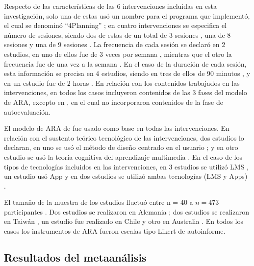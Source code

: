 \documentclass[spanish]{textolivre}
\begin{document}
Respecto de las características de las 6 intervenciones incluidas en esta investigación, solo una de estas usó un nombre para el programa que implementó, el cual se denominó “4Planning” \cite{lobos2021design}; en cuatro intervenciones se especifica el número de sesiones, siendo dos de estas de un total de 3 sesiones \cite{broadbent2020effects, van2020new}, una de 8 sesiones \cite{jansen2016fostering} y una de 9 sesiones \cite{lobos2021design}. La frecuencia de cada sesión se declaró en 2 estudios, en uno de ellos fue de 3 veces por semana \cite{bellhauser2016applying}, mientras que el otro la frecuencia fue de una vez a la semana \cite{van2020new}. En el caso de la duración de cada sesión, esta información se precisa en 4 estudios, siendo en tres de ellos de 90 minutos \cite{bellhauser2016applying, van2020new}, y en un estudio fue de 2 horas \cite{jansen2016fostering}. En relación con los contenidos trabajados en las intervenciones, en todos los casos incluyeron contenidos de las 3 fases del modelo de ARA, excepto en \textcite{lobos2021design}, en el cual no incorporaron contenidos de la fase de autoevaluación. 

El modelo de ARA de \textcite{zimmerman2000attaining} fue usado como base en todas las intervenciones. En relación con el sustento teórico tecnológico de las intervenciones, dos estudios lo declaran, en uno se usó el método de diseño centrado en el usuario \cite{lobos2021design}; y en otro estudio se usó la teoría cognitiva del aprendizaje multimedia \cite{mayer2003promise}. En el caso de los tipos de tecnologías incluidos en las intervenciones, en 3 estudios se utilizó LMS \cite{carrion2022effects,jansen2016fostering}, un estudio usó App \cite{lobos2021design} y en dos estudios se utilizó ambas tecnologías (LMS y Apps) \cite{bellhauser2016applying, broadbent2020effects}. 

El tamaño de la muestra de los estudios fluctuó entre n = 40 \cite{carrion2022effects} a $n = 473$ participantes \cite{lobos2021design}. Dos estudios se realizaron en Alemania \cite{bellhauser2016applying, van2020new}; dos estudios se realizaron en Taiwán \cite{carrion2022effects, jansen2016fostering}, un estudio fue realizado en Chile \cite{lobos2021design} y otro en Australia \cite{broadbent2020effects}. En todos los casos los instrumentos de ARA fueron escalas tipo Likert de autoinforme.


\subsection{Resultados del metaanálisis}
\end{document}
